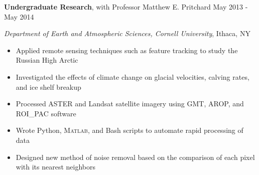 
\textbf{Undergraduate Research}, with Professor Matthew E. Pritchard \hfill May 2013 - May 2014

\textit{Department of Earth and Atmospheric Sciences, Cornell University}, Ithaca, NY

\begin{itemize}
    \item Applied remote sensing techniques such as feature tracking to study the Russian High Arctic
    \item Investigated the effects of climate change on glacial velocities, calving rates, and ice shelf breakup
    \item Processed ASTER and Landsat satellite imagery using GMT, AROP, and ROI\_PAC software
    \item Wrote Python, \textsc{Matlab}, and Bash scripts to automate rapid processing of data
    \item Designed new method of noise removal based on the comparison of each pixel with its nearest neighbors
\end{itemize}
